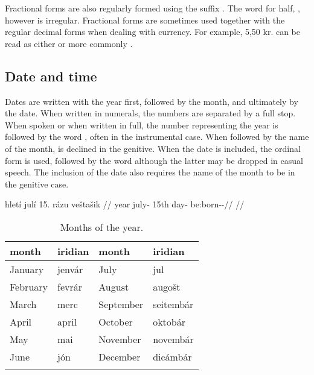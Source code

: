 Fractional forms are also regularly formed using the suffix . The word for half, , however is irregular. Fractional forms are sometimes used together with the regular decimal forms when dealing with currency. For example, 5,50 kr. can be read as either  or more commonly .

\subsection{Date and time}
Dates are written with the year first, followed by the month, and ultimately by the date. When written in numerals, the numbers are separated by a full stop. When spoken or when written in full, the number representing the year is followed by the word , often in the instrumental case. When followed by the name of the month,  is declined in the genitive. When the date is included, the ordinal form is used, followed by the word  although the latter may be dropped in casual speech. The inclusion of the date also requires the name of the month to be in the genitive case.

\pex
\a
\begingl
     hletí julí 15. rázu veštašik //
     year july-\Gen{} 15th day-\Ins{} be:born-\Av{}-\Pf{}//
    \glft {}//
\endgl
\xe

\begin{table}[h!]
	\caption{Months of the year.}
	\medskip
	\small
	\begin{tabu}to 0.7 \textwidth {YYYY}
		\toprule
		{\sc month} & {\sc iridian} & {\sc month} & {\sc iridian}\\
		\midrule
		January		& jenvár	& July & jul\\
		February	& fevrár 	& August & augošt\\
		March		& merc		& September & seitembár\\
		April		& april 	& October & oktobár\\
		May 		& mai 		& November & novembár\\
		June 		& jón 	& December & dicámbár\\
		\bottomrule
		\label{30992}
	\end{tabu}
\end{table}

